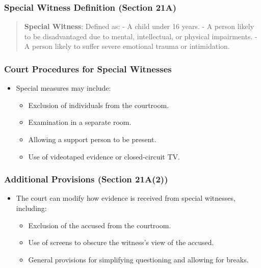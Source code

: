 \subsubsection{Special Witness Definition (Section
21A)}\label{special-witness-definition-section-21a}

\begin{quote}
\textbf{Special Witness}: Defined as: - A child under 16 years. - A
person likely to be disadvantaged due to mental, intellectual, or
physical impairments. - A person likely to suffer severe emotional
trauma or intimidation.
\end{quote}

\subsubsection{Court Procedures for Special
Witnesses}\label{court-procedures-for-special-witnesses}

\begin{itemize}
\tightlist
\item
  Special measures may include:

  \begin{itemize}
  \tightlist
  \item
    Exclusion of individuals from the courtroom.
  \item
    Examination in a separate room.
  \item
    Allowing a support person to be present.
  \item
    Use of videotaped evidence or closed-circuit TV.
  \end{itemize}
\end{itemize}

\subsubsection{Additional Provisions (Section
21A(2))}\label{additional-provisions-section-21a2}

\begin{itemize}
\tightlist
\item
  The court can modify how evidence is received from special witnesses,
  including:

  \begin{itemize}
  \tightlist
  \item
    Exclusion of the accused from the courtroom.
  \item
    Use of screens to obscure the witness's view of the accused.
  \item
    General provisions for simplifying questioning and allowing for
    breaks.
  \end{itemize}
\end{itemize}

